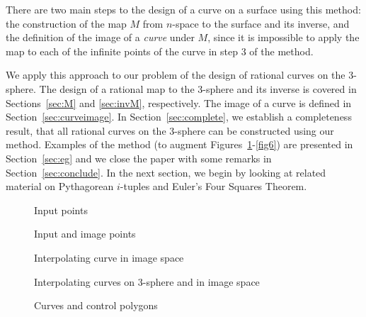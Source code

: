 There are two main steps to the design of a curve on a surface using
this method: the construction of the map $M$ from $n$-space to 
the surface and its inverse, and the definition of the image of a {\em curve} 
under $M$,
since it is impossible to apply the map to each of the infinite
points of the curve in step 3 of the method.

We apply this approach to our problem of the design of rational 
curves on the 3-sphere.
The design of a rational map to the 3-sphere and its inverse
is covered in Sections~\ref{sec:M} and \ref{sec:invM}, respectively.
The image of a curve is defined in Section~\ref{sec:curveimage}.
In Section~\ref{sec:complete}, we establish a completeness result,
that all rational curves
on the 3-sphere can be constructed using our method.
Examples of the method (to augment Figures~\ref{fig1}-\ref{fig6})
are presented in Section~\ref{sec:eg} and we close the paper
with some remarks in Section~\ref{sec:conclude}.
In the next section, we begin by looking at related material 
on Pythagorean $i$-tuples and Euler's Four Squares Theorem.

\twocolumn

\begin{figure}[h]
\vspace{2.5in}
\caption{Input points}
\label{fig1}
\end{figure}

\begin{figure}[h]
\vspace{2.5in}
\caption{Input and image points}
\label{fig2}
\end{figure}

\begin{figure}[h]
\vspace{2.5in}
\caption{Interpolating curve in image space}
\label{fig3}
\end{figure}

\begin{figure}[h]
\vspace{2.5in}
\caption{Interpolating curves on 3-sphere and in image space}
\label{fig4}
\end{figure}

\begin{figure}[h]
\vspace{2.5in}
\caption{Curves and control polygons}
\label{fig5}
\end{figure}

